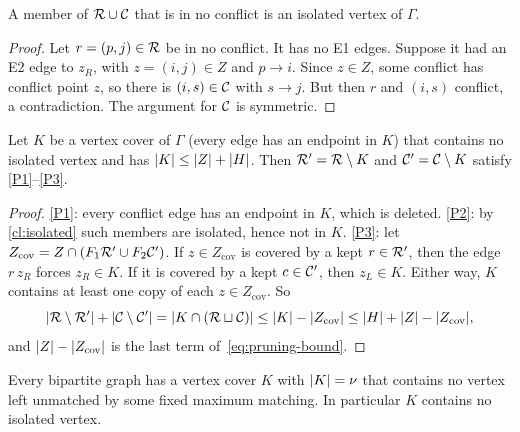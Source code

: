 \begin{claim}\label{cl:isolated}
A member of $\mathcal R\cup\mathcal C$ that is in no conflict is an isolated vertex of $\Gamma$.
\end{claim}

\begin{proof}
Let $r=(p,j)\in\mathcal R$ be in no conflict. It has no E1 edges. Suppose it had an E2
edge to $z_R$, with $z=(i,j)\in Z$ and $p\to i$. Since $z\in Z$, some conflict has
conflict point $z$, so there is $(i,s)\in\mathcal C$ with $s\to j$. But then $r$ and
$(i,s)$ conflict, a contradiction. The argument for $\mathcal C$ is symmetric.
\end{proof}

\begin{claim}\label{cl:cover-to-pruning}
Let $K$ be a vertex cover of $\Gamma$ (every edge has an endpoint in $K$) that
contains no isolated vertex and has $\lvert K\rvert\le\lvert Z\rvert+\lvert H\rvert$. Then
$\mathcal R'=\mathcal R\setminus K$ and $\mathcal C'=\mathcal C\setminus K$ satisfy \ref{P1}--\ref{P3}.
\end{claim}

\begin{proof}
\ref{P1}: every conflict edge has an endpoint in $K$, which is deleted.
\ref{P2}: by \cref{cl:isolated} such members are isolated, hence not in $K$.
\ref{P3}: let $Z_{\mathrm{cov}}=Z\cap(F_1\mathcal R'\cup F_2\mathcal C')$. If $z\in Z_{\mathrm{cov}}$ is
covered by a kept $r\in\mathcal R'$, then the edge $r\,z_R$ forces $z_R\in K$. If it
is covered by a kept $c\in\mathcal C'$, then $z_L\in K$. Either way, $K$ contains at
least one copy of each $z\in Z_{\mathrm{cov}}$. So
\[
 \lvert \mathcal R\setminus\mathcal R'\rvert+\lvert \mathcal C\setminus\mathcal C'\rvert=\lvert K\cap(\mathcal R\sqcup\mathcal C)\rvert
 \le\lvert K\rvert-\lvert Z_{\mathrm{cov}}\rvert\le\lvert H\rvert+\lvert Z\rvert-\lvert Z_{\mathrm{cov}}\rvert,
\]
and $\lvert Z\rvert-\lvert Z_{\mathrm{cov}}\rvert$ is the last term of~\eqref{eq:pruning-bound}.
\end{proof}

\begin{claim}[K\H{o}nig]\label{cl:konig}
Every bipartite graph has a vertex cover $K$ with $\lvert K\rvert=\nu$ that contains
no vertex left unmatched by some fixed maximum matching. In particular $K$
contains no isolated vertex.
\end{claim}

